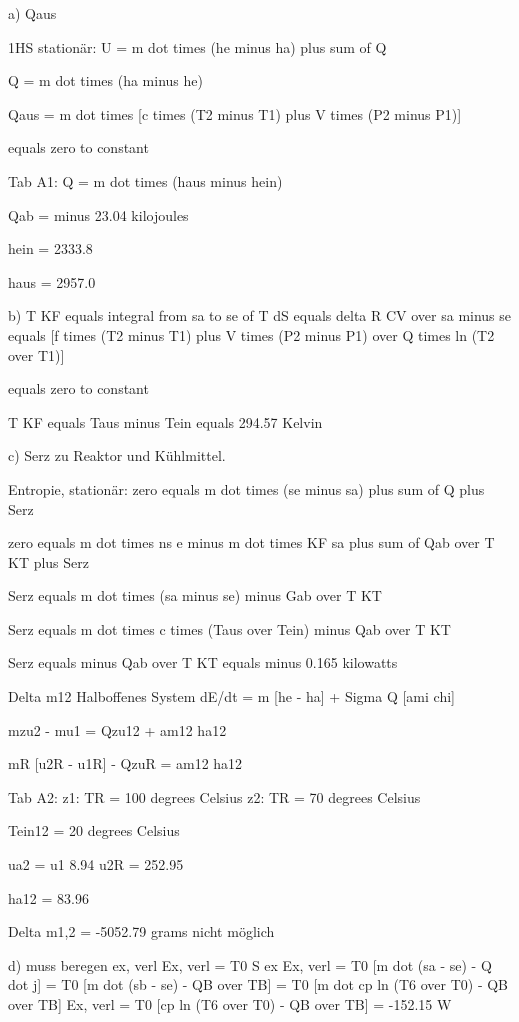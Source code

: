a) Qaus

1HS stationär: U = m dot times (he minus ha) plus sum of Q

Q = m dot times (ha minus he)

Qaus = m dot times [c times (T2 minus T1) plus V times (P2 minus P1)]

equals zero to constant

Tab A1: Q = m dot times (haus minus hein)

Qab = minus 23.04 kilojoules

hein = 2333.8

haus = 2957.0

b) T KF equals integral from sa to se of T dS equals delta R CV over sa minus se equals [f times (T2 minus T1) plus V times (P2 minus P1) over Q times ln (T2 over T1)]

equals zero to constant

T KF equals Taus minus Tein equals 294.57 Kelvin

c) Serz zu Reaktor und Kühlmittel.

Entropie, stationär: zero equals m dot times (se minus sa) plus sum of Q plus Serz

zero equals m dot times ns e minus m dot times KF sa plus sum of Qab over T KT plus Serz

Serz equals m dot times (sa minus se) minus Gab over T KT

Serz equals m dot times c times (Taus over Tein) minus Qab over T KT

Serz equals minus Qab over T KT equals minus 0.165 kilowatts

Delta m12  
Halboffenes System  
dE/dt = m [he - ha] + Sigma Q [ami chi]  

mzu2 - mu1 = Qzu12 + am12 ha12  

mR [u2R - u1R] - QzuR = am12  
ha12  

Tab A2:  
z1: TR = 100 degrees Celsius  
z2: TR = 70 degrees Celsius  

Tein12 = 20 degrees Celsius  

ua2 = u1 8.94  
u2R = 252.95  

ha12 = 83.96  

Delta m1,2 = -5052.79 grams nicht möglich

d) muss beregen ex, verl  
Ex, verl = T0 S ex  
Ex, verl = T0 [m dot (sa - se) - Q dot j]  
= T0 [m dot (sb - se) - QB over TB]  
= T0 [m dot cp ln (T6 over T0) - QB over TB]  
Ex, verl = T0 [cp ln (T6 over T0) - QB over TB]  
= -152.15 W  

